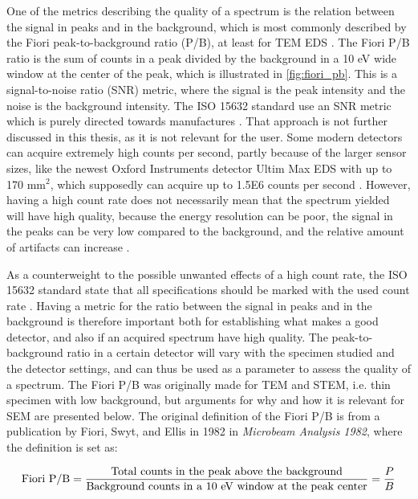 One of the metrics describing the quality of a spectrum is the relation between the signal in peaks and in the background, which is most commonly described by the Fiori peak-to-background ratio (P/B), at least for TEM EDS \cite{williams_carter_tem_2009}.
The Fiori P/B ratio is the sum of counts in a peak divided by the background in a 10 eV wide window at the center of the peak, which is illustrated in \cref{fig:fiori_pb}.
This is a signal-to-noise ratio (SNR) metric, where the signal is the peak intensity and the noise is the background intensity.
The ISO 15632 standard use an SNR metric which is purely directed towards manufactures \cite{iso_qc_15632}.
That approach is not further discussed in this thesis, as it is not relevant for the user.
Some modern detectors can acquire extremely high counts per second, partly because of the larger sensor sizes, like the newest Oxford Instruments detector Ultim Max EDS with up to 170 mm$^2$, which supposedly can acquire up to 1.5E6 counts per second \cite{oxford_ultim_max}.
However, having a high count rate does not necessarily mean that the spectrum yielded will have high quality, because the energy resolution can be poor, the signal in the peaks can be very low compared to the background, and the relative amount of artifacts can increase \cite{iso_qc_15632}.


As a counterweight to the possible unwanted effects of a high count rate, the ISO 15632 standard state that all specifications should be marked with the used count rate \cite{iso_qc_15632}.
Having a metric for the ratio between the signal in peaks and in the background is therefore important both for establishing what makes a good detector, and also if an acquired spectrum have high quality.
The peak-to-background ratio in a certain detector will vary with the specimen studied and the detector settings, and can thus be used as a parameter to assess the quality of a spectrum.
The Fiori P/B was originally made for TEM and STEM, i.e. thin specimen with low background, but arguments for why and how it is relevant for SEM are presented below.
The original definition of the Fiori P/B is from a publication by Fiori, Swyt, and Ellis in 1982 \cite{fiori_peak_background_1982} in \emph{Microbeam Analysis 1982}, where the definition is set as:

\begin{equation}
    \label{eq:fiori_pb}
    \textnormal{Fiori P/B} = \frac{\textnormal{Total counts in the peak above the background}}{\textnormal{Background counts in a 10 eV window at the peak center}} = \frac{P}{B}
\end{equation}



